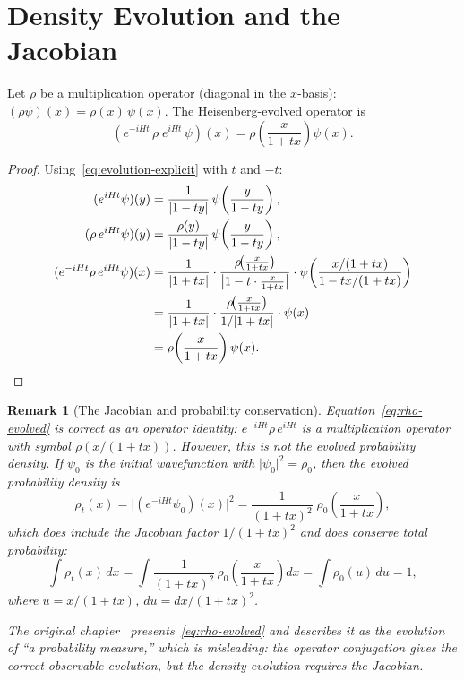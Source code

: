 \documentclass[11pt,a4paper]{article}
\newtheorem{remark}{Remark}
\begin{document}
\section{Density Evolution and the Jacobian}\label{sec:density}

Let $\rho$ be a multiplication operator (diagonal in the $x$-basis):
$(\rho\psi)(x)=\rho(x)\,\psi(x)$.  The Heisenberg-evolved operator is
\begin{equation}\label{eq:rho-evolved}
  (e^{-iHt}\,\rho\;e^{iHt}\,\psi)(x)
  =\rho\!\left(\frac{x}{1+tx}\right)\psi(x).
\end{equation}

\begin{proof}
Using~\eqref{eq:evolution-explicit} with $t$ and $-t$:
\begin{align*}
  (e^{iHt}\psi)(y)&=\frac{1}{\lvert 1-ty\rvert}\,
    \psi\!\left(\frac{y}{1-ty}\right),\\
  (\rho\,e^{iHt}\psi)(y)&=\frac{\rho(y)}{\lvert 1-ty\rvert}\,
    \psi\!\left(\frac{y}{1-ty}\right),\\
  (e^{-iHt}\rho\,e^{iHt}\psi)(x)
  &=\frac{1}{\lvert 1+tx\rvert}\cdot
    \frac{\rho\!\bigl(\frac{x}{1+tx}\bigr)}
         {\bigl\lvert 1-t\cdot\frac{x}{1+tx}\bigr\rvert}\cdot
    \psi\!\left(\frac{x/(1+tx)}{1-tx/(1+tx)}\right)\\
  &=\frac{1}{\lvert 1+tx\rvert}\cdot
    \frac{\rho\!\bigl(\frac{x}{1+tx}\bigr)}{1/\lvert 1+tx\rvert}\cdot
    \psi(x)\\
  &=\rho\!\left(\frac{x}{1+tx}\right)\psi(x).\qedhere
\end{align*}
\end{proof}

\begin{remark}[The Jacobian and probability conservation]\label{rem:jacobian}
Equation~\eqref{eq:rho-evolved} is correct as an \emph{operator identity}:
$e^{-iHt}\rho\,e^{iHt}$ is a multiplication operator with symbol
$\rho(x/(1+tx))$.  However, this is \emph{not} the evolved probability
density.  If $\psi_{0}$ is the initial wavefunction with
$\lvert\psi_{0}\rvert^{2}=\rho_{0}$, then the evolved probability density
is
\begin{equation}\label{eq:density-correct}
  \rho_{t}(x)=\lvert(e^{-iHt}\psi_{0})(x)\rvert^{2}
  =\frac{1}{(1+tx)^{2}}\;
    \rho_{0}\!\left(\frac{x}{1+tx}\right),
\end{equation}
which \emph{does} include the Jacobian factor $1/(1+tx)^{2}$ and
\emph{does} conserve total probability:
\[
  \int\rho_{t}(x)\,dx
  =\int\frac{1}{(1+tx)^{2}}\,
    \rho_{0}\!\left(\frac{x}{1+tx}\right)dx
  =\int\rho_{0}(u)\,du=1,
\]
where $u=x/(1+tx)$, $du=dx/(1+tx)^{2}$.

The original chapter~\cite{book} presents~\eqref{eq:rho-evolved} and
describes it as the evolution of ``a probability measure,'' which is
misleading: the operator conjugation gives the correct \emph{observable}
evolution, but the \emph{density} evolution requires the Jacobian.
\end{remark}
\end{document}
